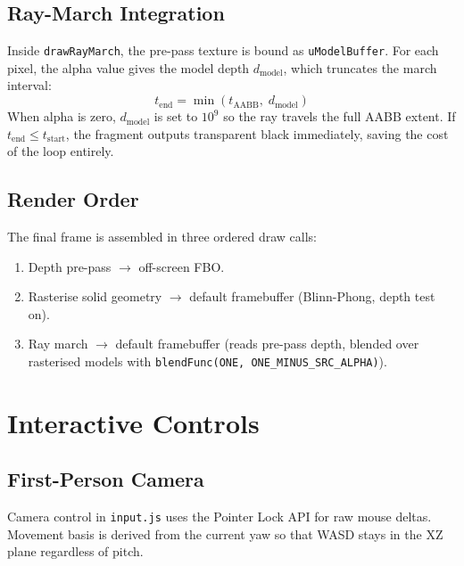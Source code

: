 \documentclass[a4paper, 12pt]{article}
\begin{document}
\subsection{Ray-March Integration}

Inside \texttt{drawRayMarch}, the pre-pass texture is bound as
\texttt{uModelBuffer}.
For each pixel, the alpha value gives the model depth $d_{\text{model}}$,
which truncates the march interval:
\[
  t_{\text{end}} = \min(t_{\text{AABB}},\; d_{\text{model}})
\]
When alpha is zero, $d_{\text{model}}$ is set to $10^9$ so the ray travels
the full AABB extent.
If $t_{\text{end}}\le t_{\text{start}}$, the fragment outputs transparent
black immediately, saving the cost of the loop entirely.

\subsection{Render Order}

The final frame is assembled in three ordered draw calls:
\begin{enumerate}[nosep]
  \item Depth pre-pass $\to$ off-screen FBO.
  \item Rasterise solid geometry $\to$ default framebuffer (Blinn-Phong,
        depth test on).
  \item Ray march $\to$ default framebuffer (reads pre-pass depth, blended
        over rasterised models with
        \texttt{blendFunc(ONE, ONE\_MINUS\_SRC\_ALPHA)}).
\end{enumerate}

\section{Interactive Controls}
\label{sec:input}

\subsection{First-Person Camera}

Camera control in \texttt{input.js} uses the Pointer Lock API for raw mouse
deltas.
Movement basis is derived from the current yaw so that WASD stays in the XZ
plane regardless of pitch.
\end{document}
